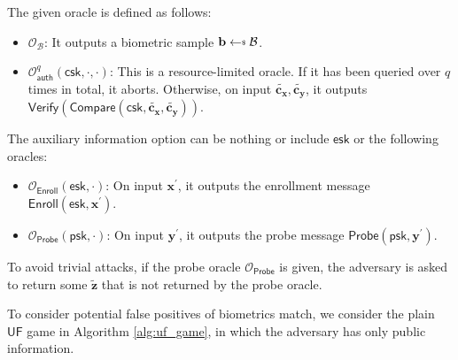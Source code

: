 The given oracle is defined as follows:

\begin{itemize}
	\item $\mathcal{O}_{\mathcal{B}}$: It outputs a biometric sample $\mathbf{b} \getsdollar \mathcal{B}$.

	\item $\mathcal{O}_\textsf{auth}^{q}(\textsf{csk}, \cdot, \cdot)$: This is a resource-limited oracle. If it has been queried over $q$ times in total, it aborts. Otherwise, on input $\mathbf{\tilde{c_x}}, \mathbf{\tilde{c_y}}$, it outputs $\textsf{Verify}(\textsf{Compare}(\textsf{csk}, \mathbf{\tilde{c_x}}, \mathbf{\tilde{c_y}} ) )$.
\end{itemize}

The auxiliary information \textsf{option} can be nothing or include $\textsf{esk}$ or the following oracles:

\begin{itemize}

	\item $\mathcal{O}_\textsf{Enroll}(\textsf{esk}, \cdot)$: On input $\mathbf{x}^\prime$, it outputs the enrollment message $\textsf{Enroll}(\textsf{esk}, \mathbf{x}^\prime)$.

	\item $\mathcal{O}_\textsf{Probe}(\textsf{psk}, \cdot)$: On input $\mathbf{y}^\prime$, it outputs the probe message $\textsf{Probe}(\textsf{psk}, \mathbf{y}^\prime)$. 
\end{itemize}

To avoid trivial attacks, if the probe oracle $\mathcal{O}_\textsf{Probe}$ is given, the adversary is asked to return some $\mathbf{\tilde{z}}$ that is not returned by the probe oracle.

To consider potential false positives of biometrics match, we consider the plain $\textsf{UF}$ game in Algorithm \ref{alg:uf_game}, in which the adversary has only public information.

